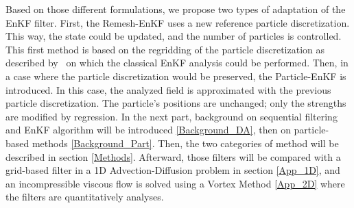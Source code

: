 Based on those different formulations, we propose two types of adaptation of the EnKF filter. First, the Remesh-EnKF uses a new reference particle discretization. This way, the state could be updated, and the number of particles is controlled. This first method is based on the regridding of the particle discretization as described by~\cite{cottet_multi-purpose_1999} on which the classical EnKF analysis could be performed.
Then, in a case where the particle discretization would be preserved, the Particle-EnKF is introduced. In this case, the analyzed field is approximated with the previous particle discretization. The particle's positions are unchanged; only the strengths are modified by regression.
In the next part, background on sequential filtering and EnKF algorithm will be introduced \ref{Background_DA}, then on particle-based methods \ref{Background_Part}. Then, the two categories of method will be described in section \ref{Methods}. Afterward, those filters will be compared with a grid-based filter in a 1D Advection-Diffusion problem in section \ref{App_1D}, and an incompressible viscous flow is solved using a Vortex Method \ref{App_2D} where the filters are quantitatively analyses.







